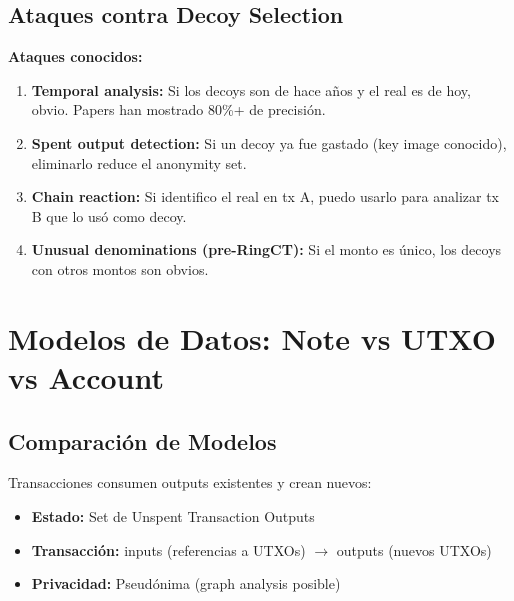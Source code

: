 \documentclass[11pt,a4paper,twoside]{book}
\begin{document}
\subsection{Ataques contra Decoy Selection}

\begin{remark}
\textbf{Ataques conocidos:}

\begin{enumerate}
    \item \textbf{Temporal analysis:} Si los decoys son de hace a\~nos y el real es de hoy, obvio. Papers han mostrado 80\%+ de precisi\'on.
    
    \item \textbf{Spent output detection:} Si un decoy ya fue gastado (key image conocido), eliminarlo reduce el anonymity set.
    
    \item \textbf{Chain reaction:} Si identifico el real en tx A, puedo usarlo para analizar tx B que lo us\'o como decoy.
    
    \item \textbf{Unusual denominations (pre-RingCT):} Si el monto es \'unico, los decoys con otros montos son obvios.
\end{enumerate}
\end{remark}

\section{Modelos de Datos: Note vs UTXO vs Account}
\label{sec:data-models}

\subsection{Comparaci\'on de Modelos}

\begin{definition}
Transacciones consumen outputs existentes y crean nuevos:
\begin{itemize}
    \item \textbf{Estado:} Set de Unspent Transaction Outputs
    \item \textbf{Transacci\'on:} inputs (referencias a UTXOs) $\to$ outputs (nuevos UTXOs)
    \item \textbf{Privacidad:} Pseud\'onima (graph analysis posible)
\end{itemize}
\end{definition}
\end{document}
